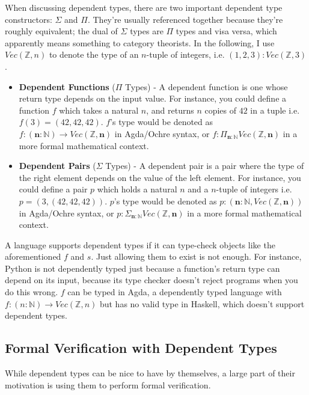 \documentclass[12pt,twoside]{report}
\begin{document}
When discussing dependent types, there are two important dependent type constructors: $\Sigma$ and $\Pi$. They're usually referenced together because they're roughly equivalent; the dual of $\Sigma$ types are $\Pi$ types and visa versa, which apparently means something to category theorists. In the following, I use $Vec(\mathbb{Z}, n)$ to denote the type of an $n$-tuple of integers, i.e. $(1, 2, 3): Vec(\mathbb{Z}, 3)$.

\begin{itemize}
  \item \textbf{Dependent Functions} ($\Pi$ Types) - A dependent function is one whose return type depends on the input value. For instance, you could define a function $f$ which takes a natural $n$, and returns $n$ copies of $42$ in a tuple i.e. $f(3) = (42, 42, 42)$. $f$'s type would be denoted as $f: (\textbf{n}: \mathbb{N}) \rightarrow Vec(\mathbb{Z}, \textbf{n})$ in Agda/Ochre syntax, or $f: \Pi_{\textbf{n}: \mathbb{N}} Vec(\mathbb{Z}, \textbf{n})$ in a more formal mathematical context.
  \item \textbf{Dependent Pairs} ($\Sigma$ Types) - A dependent pair is a pair where the type of the right element depends on the value of the left element. For instance, you could define a pair $p$ which holds a natural $n$ and a $n$-tuple of integers i.e. $p = (3, (42, 42, 42))$. $p$'s type would be denoted as $p: (\textbf{n}: \mathbb{N}, Vec(\mathbb{Z}, \textbf{n}))$ in Agda/Ochre syntax, or $p: \Sigma_{\textbf{n}: \mathbb{N}} Vec(\mathbb{Z}, \textbf{n})$ in a more formal mathematical context.
\end{itemize}

A language supports dependent types if it can type-check objects like the aforementioned $f$ and $s$. Just allowing them to exist is not enough. For instance, Python is not dependently typed just because a function's return type can depend on its input, because its type checker doesn't reject programs when you do this wrong. $f$ can be typed in Agda, a dependently typed language with $f: (n: \mathbb{N}) \rightarrow Vec(\mathbb{Z}, n)$ but has no valid type in Haskell, which doesn't support dependent types.

\subsection{Formal Verification with Dependent Types}
While dependent types can be nice to have by themselves, a large part of their motivation is using them to perform formal verification.
\end{document}
